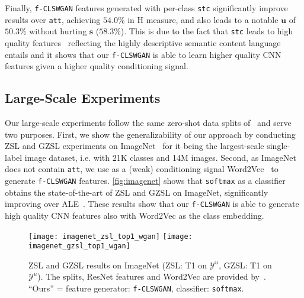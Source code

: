 \documentclass[10pt,twocolumn,letterpaper]{article}
\begin{document}
Finally, \texttt{f-CLSWGAN} features generated with per-class \texttt{stc} significantly improve results over \texttt{att}, achieving $54.0\%$ in H measure,
and also leads to a notable $\mathbf{u}$ of $50.3\%$ without hurting $\mathbf{s}$ ($58.3\%$).
This is due to the fact that \texttt{stc} leads to high quality features~\cite{RALS16} reflecting the highly descriptive semantic content language entails and it shows that our \texttt{f-CLSWGAN} is able to learn higher quality CNN features given a higher quality conditioning signal.






\subsection{Large-Scale Experiments}
Our large-scale experiments follow the same zero-shot data splits of~\cite{XSA17} and serve two purposes.
First, we show the generalizability of our approach by conducting ZSL and GZSL experiments on ImageNet~\cite{ImageNet} for it being the largest-scale single-label image dataset, i.e. with 21K classes and 14M images. Second, as ImageNet does not contain \texttt{att}, we use as a (weak) conditioning signal Word2Vec~\cite{MSCCD13} to generate \texttt{f-CLSWGAN} features. \autoref{fig:imagenet} shows that \texttt{softmax} as a classifier obtains the state-of-the-art of ZSL and GZSL on ImageNet, significantly improving over ALE~\cite{APHS15}. These results show that our \texttt{f-CLSWGAN} is able to generate high quality CNN features also with Word2Vec as the class embedding. 

\begin{figure}[t]
	\centering
		\texttt{[image: imagenet\_zsl\_top1\_wgan]}
        \texttt{[image: imagenet\_gzsl\_top1\_wgan]}
	\caption{ZSL and GZSL results on ImageNet (ZSL: T1 on $\mathcal{Y}^{u}$, GZSL: T1 on $\mathcal{Y}^{u}$). The splits, ResNet features and Word2Vec are provided by~\cite{XSA17}. ``Ours'' = feature generator: \texttt{f-CLSWGAN}, classifier: \texttt{softmax}.}
	\label{fig:imagenet}
\end{figure}
\end{document}
